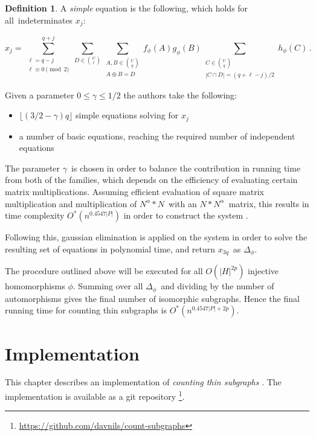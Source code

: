 \documentclass[a4paper,11pt]{report}
\theoremstyle{plain}
\theoremstyle{definition}
\newtheorem{defn}[thm]{Definition} %
\begin{document}
\begin{defn}
A \emph{simple} equation is the following, which holds for all indeterminates $x_j$:

\begin{equation}
\label{eq:xj-direct}
x_j
=
\sum_{\substack{\ell=q-j\\\ell\equiv 0\!\!\!\!\!\pmod 2}}^{q+j}
\sum_{D\in\binom{U}{\ell}}
\sum_{\substack{A,B\in\binom{U}{q}\\A\oplus B=D}}
f_\phi(A)g_\phi(B)
\sum_{\substack{C\in\binom{U}{q}\\|C\cap D|=(q+\ell-j)/2}}h_\phi(C)\,.
\end{equation}

\end{defn}

Given a parameter $0 \leq \gamma \leq 1/2$ the authors take the following:
\begin{itemize}
\item $\lfloor (3/2 - \gamma)q \rfloor$ simple equations solving for $x_j$
\item a number of basic equations, reaching the required number of independent equations
\end{itemize}

The parameter $\gamma$ is chosen in order to balance the contribution in running time from both of the families, which depends on the efficiency of evaluating certain matrix multiplications.
Assuming efficient evaluation of square matrix multiplication and multiplication of $N^\alpha * N$ with an $N * N^\alpha$ matrix, this results in time complexity $O^*(n^{0.4547|P|})$ in order to construct the system \cite{BHKK13}.

Following this, gaussian elimination is applied on the system in order to solve the resulting set of equations in polynomial time, and return $x_{3q}$ as $\Delta_\phi$.

The procedure outlined above will be executed for all $O(|H|^{2p})$ injective homomorphisms $\phi$.
Summing over all $\Delta_\phi$ and dividing by the number of automorphisms gives the final number of isomorphic subgraphs.
Hence the final running time for counting thin subgraphs is $O^*(n^{0.4547|P| + 2p})$.

\chapter{Implementation}
This chapter describes an implementation of \emph{counting thin subgraphs} \cite{BHKK13}.
The implementation is available as a git repository \footnote{\url{https://github.com/davnils/count-subgraphs}}.
\end{document}
